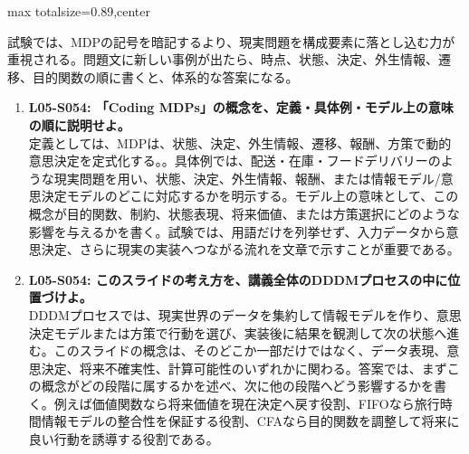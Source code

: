 \begin{minipage}[t]{0.58\textwidth}
\begin{adjustbox}{max totalsize={\textwidth}{0.89\textheight},center}
\begin{minipage}{\textwidth}
試験では、MDPの記号を暗記するより、現実問題を構成要素に落とし込む力が重視される。問題文に新しい事例が出たら、時点、状態、決定、外生情報、遷移、目的関数の順に書くと、体系的な答案になる。\par{}\begin{enumerate}\item \textbf{L05-S054: 「Coding MDPs」の概念を、定義・具体例・モデル上の意味の順に説明せよ。}\\定義としては、MDPは、状態、決定、外生情報、遷移、報酬、方策で動的意思決定を定式化する。。具体例では、配送・在庫・フードデリバリーのような現実問題を用い、状態、決定、外生情報、報酬、または情報モデル/意思決定モデルのどこに対応するかを明示する。モデル上の意味として、この概念が目的関数、制約、状態表現、将来価値、または方策選択にどのような影響を与えるかを書く。試験では、用語だけを列挙せず、入力データから意思決定、さらに現実の実装へつながる流れを文章で示すことが重要である。\item \textbf{L05-S054: このスライドの考え方を、講義全体のDDDMプロセスの中に位置づけよ。}\\DDDMプロセスでは、現実世界のデータを集約して情報モデルを作り、意思決定モデルまたは方策で行動を選び、実装後に結果を観測して次の状態へ進む。このスライドの概念は、そのどこか一部だけではなく、データ表現、意思決定、将来不確実性、計算可能性のいずれかに関わる。答案では、まずこの概念がどの段階に属するかを述べ、次に他の段階へどう影響するかを書く。例えば価値関数なら将来価値を現在決定へ戻す役割、FIFOなら旅行時間情報モデルの整合性を保証する役割、CFAなら目的関数を調整して将来に良い行動を誘導する役割である。\end{enumerate}
\end{minipage}
\end{adjustbox}
\end{minipage}


